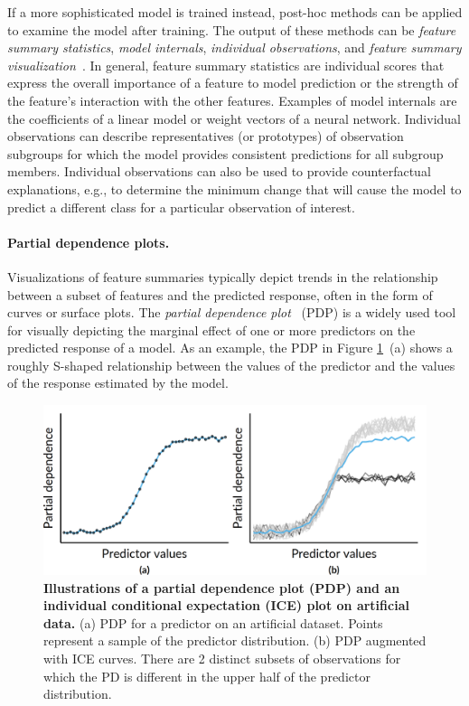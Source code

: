 \documentclass[
  oneside]{book}
\begin{document}
If a more sophisticated model is trained instead, post-hoc methods can be applied to examine the model after training.
The output of these methods can be \emph{feature summary statistics}, \emph{model internals}, \emph{individual observations}, and \emph{feature summary visualization}~\autocite{molnar2020interpretable}.
In general, feature summary statistics are individual scores that express the overall importance of a feature to model prediction or the strength of the feature's interaction with the other features.
Examples of model internals are the coefficients of a linear model or weight vectors of a neural network.
Individual observations can describe representatives (or prototypes) of observation subgroups for which the model provides consistent predictions for all subgroup members.
Individual observations can also be used to provide counterfactual explanations, e.g., to determine the minimum change that will cause the model to predict a different class for a particular observation of interest.

\paragraph*{Partial dependence plots.}

Visualizations of feature summaries typically depict trends in the relationship between a subset of features and the predicted response, often in the form of curves or surface plots.
The \emph{partial dependence plot}~\autocite{Friedman:PDP2001} (PDP) is a widely used tool for visually depicting the marginal effect of one or more predictors on the predicted response of a model.
As an example, the PDP in Figure \ref{fig:09-pd-intro}~(a) shows a roughly S-shaped relationship between the values of the predictor and the values of the response estimated by the model.



\begin{figure}[h]

{\centering \includegraphics[width=0.64\linewidth]{figures/09-pd-intro} 

}

\caption{\textbf{Illustrations of a partial dependence plot (PDP) and an individual conditional expectation (ICE) plot on artificial data.} (a) PDP for a predictor on an artificial dataset. Points represent a sample of the predictor distribution. (b) PDP augmented with ICE curves. There are 2 distinct subsets of observations for which the PD is different in the upper half of the predictor distribution.}\label{fig:09-pd-intro}
\end{figure}
\end{document}
